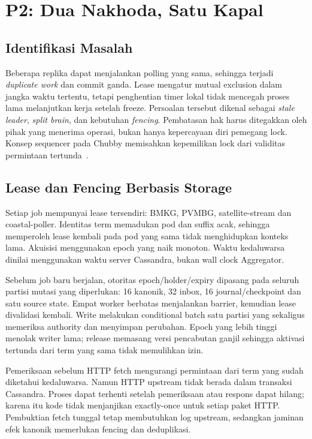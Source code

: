 \chapter{P2: Dua Nakhoda, Satu Kapal}
\section{Identifikasi Masalah}
Beberapa replika dapat menjalankan polling yang sama, sehingga terjadi \emph{duplicate work} dan commit ganda. Lease mengatur mutual exclusion dalam jangka waktu tertentu, tetapi penghentian timer lokal tidak mencegah proses lama melanjutkan kerja setelah freeze. Persoalan tersebut dikenal sebagai \emph{stale leader}, \emph{split brain}, dan kebutuhan \emph{fencing}. Pembatasan hak harus ditegakkan oleh pihak yang menerima operasi, bukan hanya kepercayaan diri pemegang lock. Konsep sequencer pada Chubby memisahkan kepemilikan lock dari validitas permintaan tertunda~\cite{chubby}.

\section{Lease dan Fencing Berbasis Storage}
Setiap job mempunyai lease tersendiri: BMKG, PVMBG, satellite-stream dan coastal-poller. Identitas term memadukan pod dan suffix acak, sehingga memperoleh lease kembali pada pod yang sama tidak menghidupkan konteks lama. Akuisisi menggunakan epoch yang naik monoton. Waktu kedaluwarsa dinilai menggunakan waktu server Cassandra, bukan wall clock Aggregator.

Sebelum job baru berjalan, otoritas epoch/holder/expiry dipasang pada seluruh partisi mutasi yang diperlukan: 16 kanonik, 32 inbox, 16 journal/checkpoint dan satu source state. Empat worker berbatas menjalankan barrier, kemudian lease divalidasi kembali. Write melakukan conditional batch satu partisi yang sekaligus memeriksa authority dan menyimpan perubahan. Epoch yang lebih tinggi menolak writer lama; release memasang versi pencabutan ganjil sehingga aktivasi tertunda dari term yang sama tidak memulihkan izin.

Pemeriksaan sebelum HTTP fetch mengurangi permintaan dari term yang sudah diketahui kedaluwarsa. Namun HTTP upstream tidak berada dalam transaksi Cassandra. Proses dapat terhenti setelah pemeriksaan atau respons dapat hilang; karena itu kode tidak menjanjikan exactly-once untuk setiap paket HTTP. Pembuktian fetch tunggal tetap membutuhkan log upstream, sedangkan jaminan efek kanonik memerlukan fencing dan deduplikasi.

